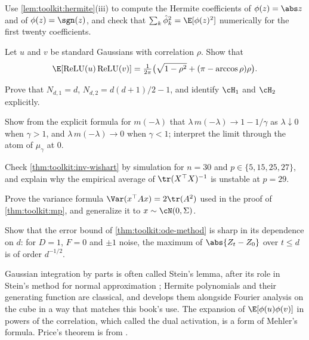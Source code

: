 \begin{refsection}
\begin{exercises}
\item \consolidation Use \cref{lem:toolkit:hermite}(iii) to compute the Hermite coefficients of $\phi(z)=\abs z$ and of $\phi(z)=\sgn(z)$, and check that $\sum_k\hat\phi_k^2=\E[\phi(z)^2]$ numerically for the first twenty coefficients.\label{ex:toolkit:coeffs}
\item \consolidation Let $u$ and $v$ be standard Gaussians with correlation $\rho$. Show that
\[
  \E[\relu(u)\relu(v)]=\tfrac1{2\pi}\big(\sqrt{1-\rho^2}+(\pi-\arccos\rho)\rho\big).
\] 
\item \consolidation Prove that $N_{d,1}=d$, $N_{d,2}=d(d+1)/2-1$, and identify $\cH_1$ and $\cH_2$ explicitly.
\item \consolidation\hard Show from the explicit formula for $m(-\lambda)$ that $\lambda\,m(-\lambda)\to1-1/\gamma$ as $\lambda\downarrow0$ when $\gamma>1$, and $\lambda\,m(-\lambda)\to0$ when $\gamma<1$; interpret the limit through the atom of $\mu_\gamma$ at $0$. 
\item \consolidation Check \cref{thm:toolkit:inv-wishart} by simulation for $n=30$ and $p\in\{5,15,25,27\}$, and explain why the empirical average of $\tr(X^\top X)^{-1}$ is unstable at $p=29$.
\item \variation Prove the variance formula $\Var(x^\top Ax)=2\tr(A^2)$ used in the proof of \cref{thm:toolkit:mp}, and generalize it to $x\sim\cN(0,\Sigma)$.
\item \consolidation\hard Show that the error bound of \cref{thm:toolkit:ode-method} is sharp in its dependence on $d$: for $D=1$, $F=0$ and $\pm1$ noise, the maximum of $\abs{Z_t-Z_0}$ over $t\le d$ is of order $d^{-1/2}$.
\end{exercises}

\notesandrefs

Gaussian integration by parts is often called Stein's lemma, after its role in Stein's method for normal approximation \parencite{Stein1981}; Hermite polynomials and their generating function are classical, and \textcite{ODonnell2014} develops them alongside Fourier analysis on the cube in a way that matches this book's use. The expansion of $\E[\phi(u)\phi(v)]$ in powers of the correlation, which \textcite{DanielyFrostigSinger2016} called the dual activation, is a form of Mehler's formula. Price's theorem is from \textcite{Price1958}.


\end{refsection}
